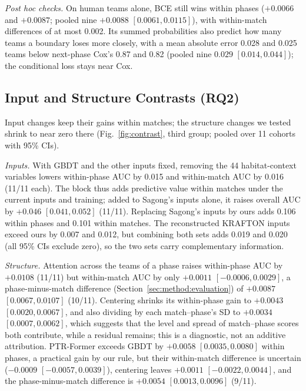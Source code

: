 \documentclass[sigconf,anonymous]{acmart}
\begin{document}
\emph{Post hoc checks.} On human teams alone, BCE still wins within phases ($+0.0066$ and $+0.0087$; pooled nine $+0.0088$ $[0.0061,\allowbreak 0.0115]$), with within-match differences of at most 0.002. Its summed probabilities also predict how many teams a boundary loses more closely, with a mean absolute error 0.028 and 0.025 teams below next-phase Cox's 0.87 and 0.82 (pooled nine $0.029$ $[0.014,\allowbreak 0.044]$); the conditional loss stays near Cox.

\subsection{Input and Structure Contrasts (RQ2)}
\label{sec:results:inputs}
Input changes keep their gains within matches; the structure changes we tested shrink to near zero there (Fig.~\ref{fig:contrast}, third group; pooled over 11 cohorts with 95\% CIs).

\emph{Inputs.} With GBDT and the other inputs fixed, removing the 44 habitat-context variables lowers within-phase AUC by 0.015 and within-match AUC by 0.016 (11/11 each). The block thus adds predictive value within matches under the current inputs and training; added to Sagong's inputs alone, it raises overall AUC by $+0.046$ $[0.041,\allowbreak 0.052]$ (11/11). Replacing Sagong's inputs by ours adds 0.106 within phases and 0.101 within matches. The reconstructed KRAFTON inputs exceed ours by 0.007 and 0.012, but combining both sets adds 0.019 and 0.020 (all 95\% CIs exclude zero), so the two sets carry complementary information.

\emph{Structure.} Attention across the teams of a phase raises within-phase AUC by $+0.0108$ (11/11) but within-match AUC by only $+0.0011$ $[-0.0006,\allowbreak 0.0029]$, a phase-minus-match difference (Section~\ref{sec:method:evaluation}) of $+0.0087$ $[0.0067,\allowbreak 0.0107]$ (10/11). Centering shrinks its within-phase gain to $+0.0043$ $[0.0020,\allowbreak 0.0067]$, and also dividing by each match--phase's SD to $+0.0034$ $[0.0007,\allowbreak 0.0062]$, which suggests that the level and spread of match--phase scores both contribute, while a residual remains; this is a diagnostic, not an additive attribution. PTR-Former exceeds GBDT by $+0.0058$ $[0.0035,\allowbreak 0.0080]$ within phases, a practical gain by our rule, but their within-match difference is uncertain ($-0.0009$ $[-0.0057,\allowbreak 0.0039]$), centering leaves $+0.0011$ $[-0.0022,\allowbreak 0.0044]$, and the phase-minus-match difference is $+0.0054$ $[0.0013,\allowbreak 0.0096]$ (9/11).
\end{document}
